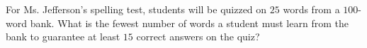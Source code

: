 For Ms. Jefferson's spelling test, students will be quizzed on $25$ words from a $100$-word bank. What is the fewest number of words a student must learn from the bank to guarantee at least $15$ correct answers on the quiz?
